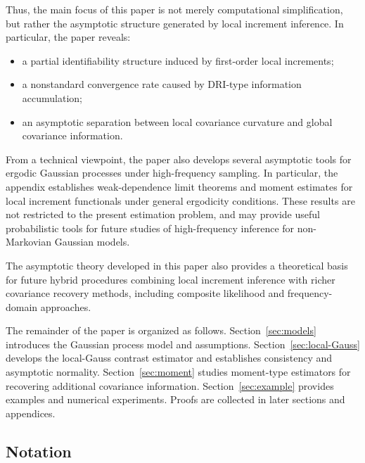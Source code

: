 \documentclass[a4paper,10pt,twoside]{article}
\numberwithin{equation}{section}
\begin{document}
Thus, the main focus of this paper is not merely computational simplification, but rather the asymptotic structure generated by local increment inference.
In particular, the paper reveals:
\begin{itemize}
\item
a partial identifiability structure induced by first-order local increments;

\item
a nonstandard convergence rate caused by DRI-type information accumulation;

\item
an asymptotic separation between local covariance curvature and global covariance information.
\end{itemize}

From a technical viewpoint, the paper also develops several asymptotic tools for ergodic Gaussian processes under high-frequency sampling.
In particular, the appendix establishes weak-dependence limit theorems and moment estimates for local increment functionals under general ergodicity conditions.
These results are not restricted to the present estimation problem, and may provide useful probabilistic tools for future studies of high-frequency inference for non-Markovian Gaussian models.

The asymptotic theory developed in this paper also provides a theoretical basis for future hybrid procedures combining local increment inference with richer covariance recovery methods, including composite likelihood and frequency-domain approaches.

The remainder of the paper is organized as follows. 
Section~\ref{sec:models} introduces the Gaussian process model and assumptions.
Section~\ref{sec:local-Gauss} develops the local-Gauss contrast estimator and establishes consistency and asymptotic normality.
Section~\ref{sec:moment} studies moment-type estimators for recovering additional covariance information.
Section~\ref{sec:example} provides examples and numerical experiments.
Proofs are collected in later sections and appendices.


\subsection*{Notation}
\end{document}

